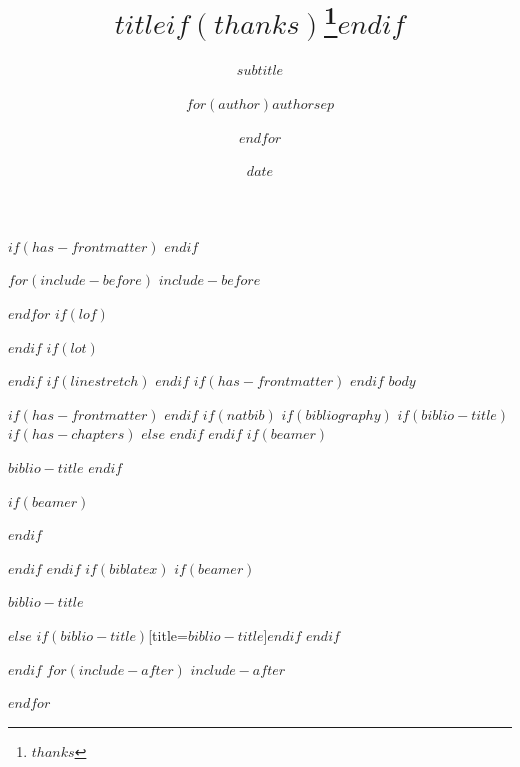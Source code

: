 \documentclass[
$if(fontsize)$
  $fontsize$,
$endif$
$if(papersize)$
  $papersize$paper,
$endif$
$if(beamer)$
  ignorenonframetext,
$if(handout)$
  handout,
$endif$
$if(aspectratio)$
  aspectratio=$aspectratio$,
$endif$
$endif$
$for(classoption)$
  $classoption$$sep$,
$endfor$
]{$documentclass$}
\title{$title$$if(thanks)$\thanks{$thanks$}$endif$}
\subtitle{$subtitle$}
\author{$for(author)$$author$$sep$ \and $endfor$}
\date{$date$}
\institute{$for(institute)$$institute$$sep$ \and $endfor$}
\newif\ifbibliography
\begin{document}
$if(has-frontmatter)$
\frontmatter
$endif$

$for(include-before)$
$include-before$

$endfor$
$if(lof)$
\listoffigures
$endif$
$if(lot)$
\listoftables
$endif$
$if(linestretch)$
$endif$
$if(has-frontmatter)$
\mainmatter
$endif$
$body$

$if(has-frontmatter)$
\backmatter
$endif$
$if(natbib)$
$if(bibliography)$
$if(biblio-title)$
$if(has-chapters)$
\renewcommand\bibname{$biblio-title$}
$else$
\renewcommand\refname{$biblio-title$}
$endif$
$endif$
$if(beamer)$
\begin{frame}[allowframebreaks]{$biblio-title$}
  \bibliographytrue
$endif$
  
$if(beamer)$
\end{frame}
$endif$

$endif$
$endif$
$if(biblatex)$
$if(beamer)$
\begin{frame}[allowframebreaks]{$biblio-title$}
  \bibliographytrue
  \printbibliography[heading=none]
\end{frame}
$else$
\printbibliography$if(biblio-title)$[title=$biblio-title$]$endif$
$endif$

$endif$
$for(include-after)$
$include-after$

$endfor$
\end{document}
